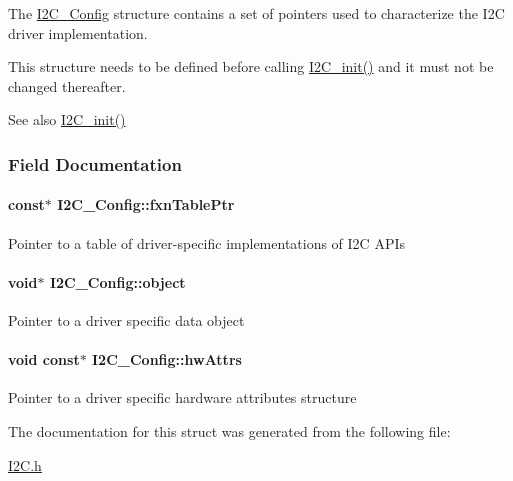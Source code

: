 The \hyperlink{struct_i2_c___config}{I2\+C\+\_\+\+Config} structure contains a set of pointers used to characterize the I2\+C driver implementation.

This structure needs to be defined before calling \hyperlink{_i2_c_8h_a9ff51ddf1d325776fef90cce0223772b}{I2\+C\+\_\+init()} and it must not be changed thereafter.

\begin{DoxySeeAlso}{See also}
\hyperlink{_i2_c_8h_a9ff51ddf1d325776fef90cce0223772b}{I2\+C\+\_\+init()} 
\end{DoxySeeAlso}


\subsubsection{Field Documentation}
\paragraph[{fxn\+Table\+Ptr}]{ const$\ast$ I2\+C\+\_\+\+Config\+::fxn\+Table\+Ptr}\label{struct_i2_c___config_a225800ca2923178397645d520bc6a0c1}
Pointer to a table of driver-\/specific implementations of I2\+C A\+P\+Is 
\paragraph[{object}]{\setlength{\rightskip}{0pt plus 5cm}void$\ast$ I2\+C\+\_\+\+Config\+::object}\label{struct_i2_c___config_abeb7af699744bd43dc1fc5019073fd2c}
Pointer to a driver specific data object 
\paragraph[{hw\+Attrs}]{\setlength{\rightskip}{0pt plus 5cm}void const$\ast$ I2\+C\+\_\+\+Config\+::hw\+Attrs}\label{struct_i2_c___config_a1c623e253c0d5f896ad8037635f0c719}
Pointer to a driver specific hardware attributes structure 

The documentation for this struct was generated from the following file\+:\begin{DoxyCompactItemize}
\item 
\hyperlink{_i2_c_8h}{I2\+C.\+h}\end{DoxyCompactItemize}
